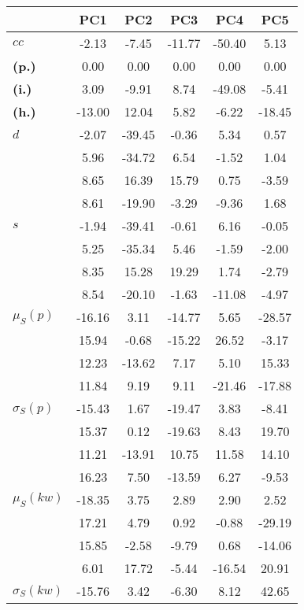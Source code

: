 \begin{table}[h!]
\begin{center}
\begin{tabular}{| l || c | c | c | c | c |}\hline
 & {\bf PC1} & {\bf PC2} & {\bf PC3} & {\bf PC4} & {\bf PC5} \\\hline\hline
{\bf $cc$} & -2.13 & -7.45 & -11.77 & -50.40 & 5.13 \\
{\bf (p.)} & 0.00 & 0.00 & 0.00 & 0.00 & 0.00 \\
{\bf (i.)} & 3.09 & -9.91 & 8.74 & -49.08 & -5.41 \\
{\bf (h.)} & -13.00 & 12.04 & 5.82 & -6.22 & -18.45 \\\hline
{\bf $d$} & -2.07 & -39.45 & -0.36 & 5.34 & 0.57 \\
{\bf } & 5.96 & -34.72 & 6.54 & -1.52 & 1.04 \\
{\bf } & 8.65 & 16.39 & 15.79 & 0.75 & -3.59 \\
{\bf } & 8.61 & -19.90 & -3.29 & -9.36 & 1.68 \\\hline
{\bf $s$} & -1.94 & -39.41 & -0.61 & 6.16 & -0.05 \\
{\bf } & 5.25 & -35.34 & 5.46 & -1.59 & -2.00 \\
 & 8.35  & 15.28  & 19.29  & 1.74  & -2.79 \\
 & 8.54  & -20.10  & -1.63  & -11.08  & -4.97 \\\hline
$\mu_S(p)$ & -16.16  & 3.11  & -14.77  & 5.65  & -28.57 \\
 & 15.94  & -0.68  & -15.22  & 26.52  & -3.17 \\
 & 12.23  & -13.62  & 7.17  & 5.10  & 15.33 \\
 & 11.84  & 9.19  & 9.11  & -21.46  & -17.88 \\\hline
$\sigma_S(p)$ & -15.43  & 1.67  & -19.47  & 3.83  & -8.41 \\
 & 15.37  & 0.12  & -19.63  & 8.43  & 19.70 \\
 & 11.21  & -13.91  & 10.75  & 11.58  & 14.10 \\
 & 16.23  & 7.50  & -13.59  & 6.27  & -9.53 \\\hline
$\mu_S(kw)$ & -18.35  & 3.75  & 2.89  & 2.90  & 2.52 \\
 & 17.21  & 4.79  & 0.92  & -0.88  & -29.19 \\
 & 15.85  & -2.58  & -9.79  & 0.68  & -14.06 \\
 & 6.01  & 17.72  & -5.44  & -16.54  & 20.91 \\\hline
$\sigma_S(kw)$ & -15.76  & 3.42  & -6.30  & 8.12  & 42.65 \\

\end{tabular}
\end{center}
\end{table}
